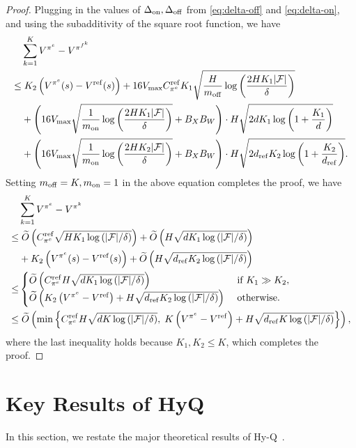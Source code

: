 \begin{proof}
Plugging in the values of $\Delta_\mathrm{on},\Delta_\mathrm{off}$ from \eqref{eq:delta-off} and \eqref{eq:delta-on}, and using the subadditivity of the square root function, we have 
{\small
\begin{equation}
    \begin{split}
        &\sum_{k=1}^K V^{\pi^e}-V^{\pi^{f^k}}\\
        \leq&\;K_2\left( V^{\pi^e}(s)-V^{\mathrm{ref}}(s) \right)+
        16V_{\max}  C_{\pi^e}^\mathrm{ref}K_1\sqrt{\frac{H}{m_\mathrm{off}}\log\left( \frac{2HK_1|\mathcal F|}{\delta} \right)}\\
        \;&+ \left( 16V_{\max}\sqrt{\frac{1}{m_\mathrm{on}}\log\left( \frac{2HK_1|\mathcal F|}{\delta} \right)}+B_XB_W \right)\cdot H\sqrt{2dK_1\log\left( 1+\frac{K_1}{d} \right)}\\
        \;&+ \left( 16V_{\max}\sqrt{\frac{1}{m_\mathrm{on}}\log\left( \frac{2HK_2|\mathcal F|}{\delta} \right)}+B_XB_W \right)\cdot H\sqrt{2d_\mathrm{ref}K_2\log\left( 1+\frac{K_2}{d_\mathrm{ref}} \right)}.
    \end{split}
\end{equation}
}
Setting $m_\mathrm{off} = K,m_\mathrm{on}=1$ in the above equation completes the proof, we have
\begin{equation}
    \begin{split}
        &\sum_{k=1}^KV^{\pi^e}-V^{\pi^k}\\
        \leq&\; \widetilde{O}\left( C_{\pi^e}^\mathrm{ref}\sqrt{HK_1\log\left( |\mathcal F|/\delta \right)} \right) + \widetilde{O}\left( H \sqrt{dK_1\log\left( |\mathcal F|/\delta \right)} \right)\\
        &+K_2\left( V^{\pi^e}(s)-V^{\mathrm{ref}}(s) \right)+\widetilde{O}\left( H \sqrt{d_\mathrm{ref}K_2\log\left( |\mathcal F|/\delta \right)} \right)\\
        \leq &\begin{cases}
            \widetilde{O}\left( C^\mathrm{ref}_{\pi^e}H\sqrt{dK_1\log\left( |\mathcal F|/\delta \right)} \right)&\text{ if } K_1\gg K_2,\\
            \widetilde{O}\left( K_2\left( V^{\pi^e}-V^\mathrm{ref} \right)+H\sqrt{d_\mathrm{ref}K_2\log\left( |\mathcal F|/\delta \right)} \right)&\text{ otherwise.} 
        \end{cases}\\
        \leq&\; \widetilde{O}\left( \min\left\{ C_{\pi^e}^\mathrm{ref}H\sqrt{dK\log\left( |\mathcal F|/\delta \right)},\;K\left( V^{\pi^e}-V^\mathrm{ref} \right)+H\sqrt{d_\mathrm{ref}K\log\left( |\mathcal F|/\delta \right)} \right\} \right),
    \end{split} 
\end{equation}
where the last inequality holds because $K_1,K_2\leq K$, which completes the proof.
\end{proof}


\section{Key Results of HyQ~\citep{song2023hybrid}}
In this section, we restate the major theoretical results of Hy-Q~\citep{song2023hybrid}. 

